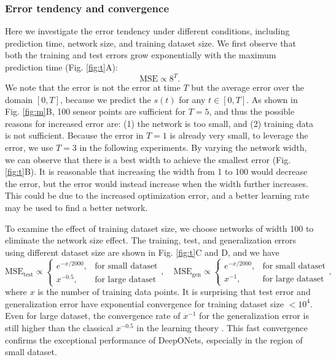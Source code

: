 \documentclass[11pt]{article}
\begin{document}
\subsubsection{Error tendency and convergence}
\label{sec:error}

Here we investigate the error tendency under different conditions, including prediction time, network size, and training dataset size. We first observe that both the training and test errors grow exponentially with the maximum prediction time (Fig. \ref{fig:t}A): 
\[ \text{MSE} \propto 8^T. \]
We note that the error is not the error at time $T$ but the average error over the domain $[0, T]$, because we predict the $s(t)$ for any $t \in [0, T]$. As shown in Fig. \ref{fig:m}B, 100 sensor points are sufficient for $T=5$, and thus the possible reasons for increased error are: (1) the network is too small, and (2) training data is not sufficient. Because the error in $T=1$ is already very small, to leverage the error, we use $T=3$ in the following experiments. By varying the network width, we can observe that there is a best width to achieve the smallest error (Fig. \ref{fig:t}B). It is reasonable that increasing the width from 1 to 100 would decrease the error, but the error would instead increase when the width further increases. This could be due to the increased optimization error, and a better learning rate may be used to find a better network.

To examine the effect of training dataset size, we choose networks of width 100 to eliminate the network size effect. The training, test, and generalization errors using different dataset size are shown in Fig. \ref{fig:t}C and D, and we have
\begin{equation*}
\text{MSE}_{\text{test}} \propto \begin{cases} e^{-x/2000}, & \text{for small dataset} \\ x^{-0.5}, & \text{for large dataset} \end{cases}, \quad
\text{MSE}_{\text{gen}} \propto \begin{cases} e^{-x/2000}, & \text{for small dataset} \\ x^{-1}, & \text{for large dataset} \end{cases},
\end{equation*}
where $x$ is the number of training data points. It is surprising that test error and generalization error have exponential convergence for training dataset size $< 10^4$. Even for large dataset, the convergence rate of $x^{-1}$ for the generalization error is still higher than the classical $x^{-0.5}$ in the learning theory \cite{mitzenmacher2017probability}. This fast convergence confirms the exceptional performance of DeepONets, especially in the region of small dataset.
\end{document}
